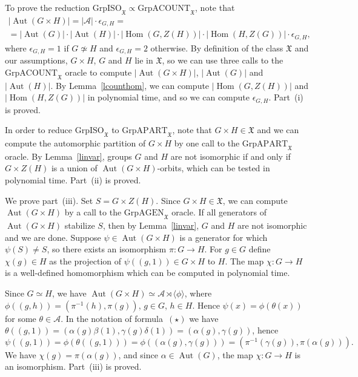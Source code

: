 \documentclass{article}
\DeclareMathOperator{\Aut}{Aut}
\DeclareMathOperator{\Hom}{Hom}
\newcommand{\X}{\mathfrak{X}}
\begin{document}
To prove the reduction \( \mathrm{GrpISO}_\X \propto \mathrm{GrpACOUNT}_\X \), note that
\begin{multline*}
	|\Aut(G \times H)| = |\mathcal{A}| \cdot \epsilon_{G,H} = \\ = |\Aut(G)| \cdot |\Aut(H)| \cdot |\Hom(G, Z(H))| \cdot |\Hom(H, Z(G))| \cdot \epsilon_{G,H},
\end{multline*}
where \( \epsilon_{G,H} = 1 \) if \( G \not\simeq H \) and \( \epsilon_{G,H} = 2 \) otherwise. By definition of the class \( \X \) and our assumptions,
\( G \times H \), \( G \) and \( H \) lie in \( \X \), so we can use three calls to the \( \mathrm{GrpACOUNT}_\X \) oracle to compute
\( |\Aut(G \times H)| \), \( |\Aut(G)| \) and \( |\Aut(H)| \). By Lemma~\ref{lcounthom}, we can compute \( |\Hom(G, Z(H))| \) and \( |\Hom(H, Z(G))| \)
in polynomial time, and so we can compute \( \epsilon_{G,H} \). Part~(i) is proved.

In order to reduce \( \mathrm{GrpISO}_\X \) to \( \mathrm{GrpAPART}_\X \), note that \( G \times H \in \X \) and we can compute the automorphic
partition of \( G \times H \) by one call to the \( \mathrm{GrpAPART}_\X \) oracle. By Lemma~\ref{linvar}, groups \( G \) and \( H \) are not isomorphic if and only if
\( G \times Z(H) \) is a union of \( \Aut(G \times H) \)-orbits, which can be tested in polynomial time. Part~(ii) is proved.

We prove part~(iii). Set \( S = G \times Z(H) \). Since \( G \times H \in \X \), we can compute \( \Aut(G \times H) \) by a call to the \( \mathrm{GrpAGEN}_\X \) oracle.
If all generators of \( \Aut(G \times H) \) stabilize \( S \), then by Lemma~\ref{linvar}, \( G \) and \( H \) are not isomorphic and we are done.
Suppose \( \psi \in \Aut(G \times H) \) is a generator for which \( \psi(S) \neq S \), so there exists an isomorphism \( \pi : G \to H \).
For \( g \in G \) define \( \chi(g) \in H \) as the projection of \( \psi((g, 1)) \in G \times H \) to \( H \).
The map \( \chi : G \to H \) is a well-defined homomorphism which can be computed in polynomial time.

Since \( G \simeq H \), we have \( \Aut(G \times H) \simeq \mathcal{A} \rtimes \langle \phi \rangle \),
where \( \phi((g, h)) = (\pi^{-1}(h), \pi(g)) \), \( g \in G \), \( h \in H \). Hence \( \psi(x) = \phi(\theta(x)) \)
for some \( \theta \in \mathcal{A} \). In the notation of formula~\( (\star) \) we have
\( \theta((g, 1)) = (\alpha(g)\beta(1), \gamma(g)\delta(1)) = (\alpha(g), \gamma(g)) \), hence
\[ \psi((g, 1)) = \phi(\theta((g,1))) = \phi((\alpha(g), \gamma(g))) = (\pi^{-1}(\gamma(g)), \pi(\alpha(g))). \]
We have \( \chi(g) = \pi(\alpha(g)) \), and since \( \alpha \in \Aut(G) \), the map \( \chi : G \to H \) is an isomorphism.
Part~(iii) is proved.
\end{document}
